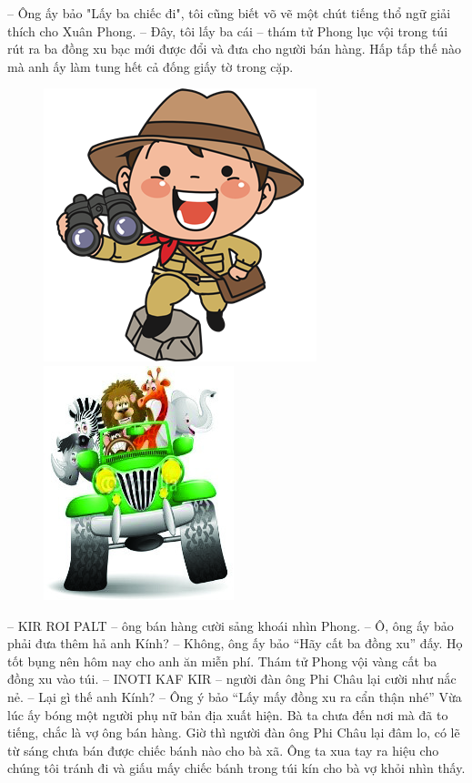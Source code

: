 	\vskip 0.1cm
	-- Ông ấy bảo "Lấy ba chiếc đi", tôi cũng biết võ vẽ một chút tiếng thổ ngữ giải thích cho Xuân Phong.
		\vskip 0.1cm
	-- Đây, tôi lấy ba cái -- thám tử Phong lục vội trong túi rút ra ba đồng xu bạc mới được đổi và đưa cho người bán hàng. Hấp tấp thế nào mà anh ấy làm tung hết cả đống giấy tờ trong cặp. 
		\begin{figure}[H]
			\centering
			\vspace*{-5pt}
			\captionsetup{labelformat= empty, justification=centering}
			\includegraphics[height=0.4\linewidth]{1}\quad
			\includegraphics[height=0.4\linewidth]{2}
			\vspace*{-15pt}
		\end{figure}
	-- KIR ROI PALT -- ông bán hàng cười sảng khoái nhìn Phong. 
	\vskip 0.1cm
	-- Ô, ông ấy bảo phải đưa thêm hả anh Kính? 
	\vskip 0.1cm
	-- Không, ông ấy bảo “Hãy cất ba đồng xu” đấy. Họ tốt bụng nên hôm nay cho anh ăn miễn phí.
	\vskip 0.1cm 
	Thám tử Phong vội vàng cất ba đồng xu vào túi. 
	\vskip 0.1cm
	-- INOTI KAF KIR -- người đàn ông Phi Châu lại cười như nắc nẻ. 
	\vskip 0.1cm
	-- Lại gì thế anh Kính?
	\vskip 0.1cm
	-- Ông ý bảo “Lấy mấy đồng xu ra cẩn thận nhé” 
	\vskip 0.1cm
	Vừa lúc ấy bóng một người phụ nữ bản địa xuất hiện. Bà ta chưa đến nơi mà đã to tiếng, chắc là vợ ông bán hàng. Giờ thì người đàn ông Phi Châu lại đâm lo, có lẽ từ sáng chưa bán được chiếc bánh nào cho bà xã. Ông ta xua tay ra hiệu cho chúng tôi tránh đi và giấu mấy chiếc bánh trong túi kín cho bà vợ khỏi nhìn thấy. 
